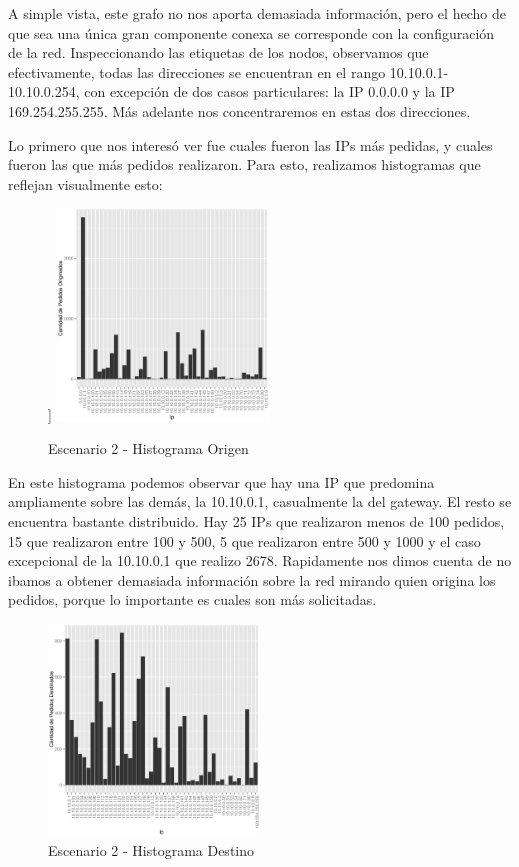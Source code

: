     A simple vista, este grafo no nos aporta demasiada información, pero el hecho de que sea una única gran componente conexa se corresponde con la configuración de la red. Inspeccionando las etiquetas de los nodos, observamos que efectivamente, todas las direcciones se encuentran en el rango 10.10.0.1-10.10.0.254, con excepción de dos casos particulares: la IP 0.0.0.0 y la IP 169.254.255.255. Más adelante nos concentraremos en estas dos direcciones. 
    \par Lo primero que nos interesó ver fue cuales fueron las IPs más pedidas, y cuales fueron las que más pedidos realizaron. Para esto, realizamos histogramas que reflejan visualmente esto:
\begin{figure}[!h]]
		\centering
		\includegraphics[width=0.5\textwidth]{img/graph/escenario_2/histogramSrc.eps}
		\caption{Escenario 2 - Histograma Origen}
		\label{fig:escenario2_histogramaSrc}
	\end{figure}       
    En este histograma podemos observar que hay una IP que predomina ampliamente sobre las demás, la 10.10.0.1, casualmente la del gateway. El resto se encuentra bastante distribuido. Hay 25 IPs que realizaron menos de 100 pedidos, 15 que realizaron entre 100 y 500, 5 que realizaron entre 500 y 1000 y el caso excepcional de la 10.10.0.1 que realizo 2678. Rapidamente nos dimos cuenta de no ibamos a obtener demasiada información sobre la red mirando quien origina los pedidos, porque lo importante es cuales son más solicitadas.
       
    \begin{figure}[!h]
		\centering
		\includegraphics[width=0.5\textwidth]{img/graph/escenario_2/histogramDst.eps}
		\caption{Escenario 2 - Histograma Destino}
		\label{fig:escenario2_histogramaDst}
	\end{figure}
            
